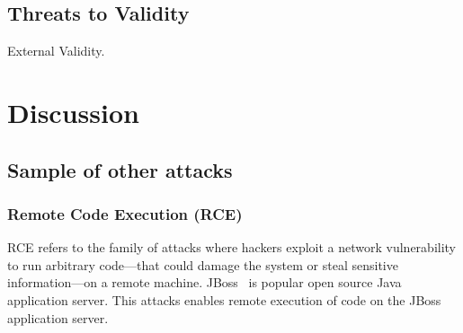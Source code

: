 \documentclass[sigconf,review, anonymous]{acmart}
\begin{document}


\subsection{Threats to Validity}
\label{sec:threats}

External Validity. 


\section{Discussion}

\subsection{Sample of other attacks}

\subsubsection{Remote Code Execution (RCE)}
\label{sec:rce}
\label{sec:jboss}
\label{sec:content-example}


RCE refers to the family of attacks where hackers exploit a network
vulnerability to run arbitrary code---that could damage the system or
steal sensitive information---on a remote machine. JBoss~\cite{jboss}
is popular open source Java application server. This attacks enables
remote execution of code on the JBoss application server.
\end{document}
